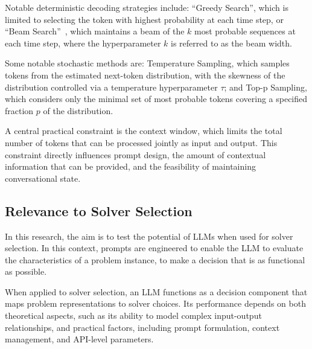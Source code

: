 \documentclass[../../main]{subfiles}
\begin{document}
Notable deterministic decoding strategies include: ``Greedy Search'', which is limited to selecting the token with highest probability at each time step, or ``Beam Search''~\cite{BeamSearch}, which maintains a beam of the $k$ most probable sequences at each time step, where the hyperparameter $k$ is referred to as the beam width.

Some notable stochastic methods are: Temperature Sampling, which samples tokens from the estimated next-token distribution, with the skewness of the distribution controlled via a temperature hyperparameter $\tau$; and Top-p Sampling, which considers only the minimal set of most probable tokens covering a specified fraction $p$ of the distribution.

A central practical constraint is the context window, which limits the total number of tokens that can be processed jointly as input and output. This constraint directly influences prompt design, the amount of contextual information that can be provided, and the feasibility of maintaining conversational state.

\subsection{Relevance to Solver Selection}
In this research, the aim is to test the potential of LLMs when used for solver selection. In this context, prompts are engineered to enable the LLM to evaluate the characteristics of a problem instance, to make a decision that is as functional as possible. 

When applied to solver selection, an LLM functions as a decision component that maps problem representations to solver choices. Its performance depends on both theoretical aspects, such as its ability to model complex input-output relationships, and practical factors, including prompt formulation, context management, and API-level parameters.
\end{document}
